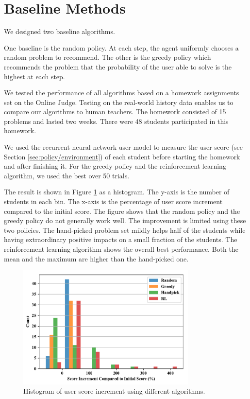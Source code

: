 \section{Baseline Methods}

    We designed two baseline algorithms.

    One baseline is the random policy.
    At each step, the agent uniformly chooses a random problem to recommend.
    The other is the greedy policy which recommends the problem that
    the probability of the user able to solve is the highest at each step.

    We tested the performance of all algorithms based on a homework assignments set on the Online Judge.
    Testing on the real-world history data enables us to compare our algorithms to human teachers.
    The homework consisted of 15 problems and lasted two weeks.
    There were 48 students participated in this homework.

    We used the recurrent neural network user model to measure the user score (see Section \ref{sec:policy/environment})
    of each student before starting the homework and after finishing it.
    For the greedy policy and the reinforcement learning algorithm,
    we used the best over 50 trials.

    The result is shown in Figure \ref{fig:policy-hist} as a histogram.
    The y-axis is the number of students in each bin.
    The x-axis is the percentage of user score increment compared to the initial score.
    The figure shows that the random policy and the greedy policy do not generally work well.
    The improvement is limited using these two policies.
    The hand-picked problem set mildly helps half of the students
    while having extraordinary positive impacts on a small fraction of the students.
    The reinforcement learning algorithm shows the overall best performance.
    Both the mean and the maximum are higher than the hand-picked one.

    \begin{figure}[htp]
        \centering
        \includegraphics[width=0.8\textwidth]{img/policy-hist.pdf}
        \caption{Histogram of user score increment using different algorithms.}
        \label{fig:policy-hist}
    \end{figure}








